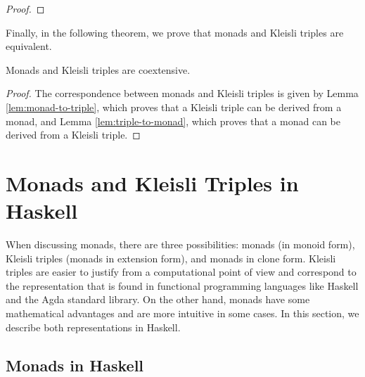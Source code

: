 \begin{lemma}
\begin{proof}
  \end{proof}

\end{lemma}

Finally, in the following theorem, we prove that monads and Kleisli
triples are equivalent.

\begin{theorem}
  \label{the:monad-triple}

  Monads and Kleisli triples are coextensive.

  \begin{proof}

    The correspondence between monads and Kleisli triples is given by
    Lemma \ref{lem:monad-to-triple}, which proves that a Kleisli
    triple can be derived from a monad, and Lemma
    \ref{lem:triple-to-monad}, which proves that a monad can be
    derived from a Kleisli triple.

  \end{proof}

\end{theorem}

\section{Monads and Kleisli Triples in Haskell}
\label{sec:monads-haskell}

When discussing monads, there are three possibilities: monads (in
monoid form), Kleisli triples (monads in extension form), and monads
in clone form. Kleisli triples are easier to justify from a
computational point of view and correspond to the representation that
is found in functional programming languages like Haskell and the Agda
standard library. On the other hand, monads have some mathematical
advantages and are more intuitive in some cases. In this section, we
describe both representations in Haskell.

\subsection{Monads in Haskell}

